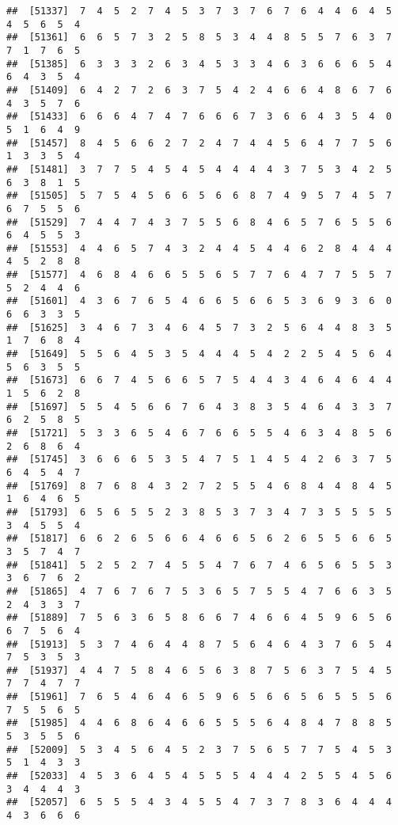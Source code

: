 \documentclass[
]{book}
\begin{document}
\begin{verbatim}
##  [51337]  7  4  5  2  7  4  5  3  7  3  7  6  7  6  4  4  6  4  5  4  5  6  5  4
##  [51361]  6  6  5  7  3  2  5  8  5  3  4  4  8  5  5  7  6  3  7  7  1  7  6  5
##  [51385]  6  3  3  3  2  6  3  4  5  3  3  4  6  3  6  6  6  5  4  6  4  3  5  4
##  [51409]  6  4  2  7  2  6  3  7  5  4  2  4  6  6  4  8  6  7  6  4  3  5  7  6
##  [51433]  6  6  6  4  7  4  7  6  6  6  7  3  6  6  4  3  5  4  0  5  1  6  4  9
##  [51457]  8  4  5  6  6  2  7  2  4  7  4  4  5  6  4  7  7  5  6  1  3  3  5  4
##  [51481]  3  7  7  5  4  5  4  5  4  4  4  4  3  7  5  3  4  2  5  6  3  8  1  5
##  [51505]  5  7  5  4  5  6  6  5  6  6  8  7  4  9  5  7  4  5  7  6  7  5  5  6
##  [51529]  7  4  4  7  4  3  7  5  5  6  8  4  6  5  7  6  5  5  6  6  4  5  5  3
##  [51553]  4  4  6  5  7  4  3  2  4  4  5  4  4  6  2  8  4  4  4  4  5  2  8  8
##  [51577]  4  6  8  4  6  6  5  5  6  5  7  7  6  4  7  7  5  5  7  5  2  4  4  6
##  [51601]  4  3  6  7  6  5  4  6  6  5  6  6  5  3  6  9  3  6  0  6  6  3  3  5
##  [51625]  3  4  6  7  3  4  6  4  5  7  3  2  5  6  4  4  8  3  5  1  7  6  8  4
##  [51649]  5  5  6  4  5  3  5  4  4  4  5  4  2  2  5  4  5  6  4  5  6  3  5  5
##  [51673]  6  6  7  4  5  6  6  5  7  5  4  4  3  4  6  4  6  4  4  1  5  6  2  8
##  [51697]  5  5  4  5  6  6  7  6  4  3  8  3  5  4  6  4  3  3  7  6  2  5  8  5
##  [51721]  5  3  3  6  5  4  6  7  6  6  5  5  4  6  3  4  8  5  6  2  6  8  6  4
##  [51745]  3  6  6  6  5  3  5  4  7  5  1  4  5  4  2  6  3  7  5  6  4  5  4  7
##  [51769]  8  7  6  8  4  3  2  7  2  5  5  4  6  8  4  4  8  4  5  1  6  4  6  5
##  [51793]  6  5  6  5  5  2  3  8  5  3  7  3  4  7  3  5  5  5  5  3  4  5  5  4
##  [51817]  6  6  2  6  5  6  6  4  6  6  5  6  2  6  5  5  6  6  5  3  5  7  4  7
##  [51841]  5  2  5  2  7  4  5  5  4  7  6  7  4  6  5  6  5  5  3  3  6  7  6  2
##  [51865]  4  7  6  7  6  7  5  3  6  5  7  5  5  4  7  6  6  3  5  2  4  3  3  7
##  [51889]  7  5  6  3  6  5  8  6  6  7  4  6  6  4  5  9  6  5  6  6  7  5  6  4
##  [51913]  5  3  7  4  6  4  4  8  7  5  6  4  6  4  3  7  6  5  4  7  5  3  5  3
##  [51937]  4  4  7  5  8  4  6  5  6  3  8  7  5  6  3  7  5  4  5  7  7  4  7  7
##  [51961]  7  6  5  4  6  4  6  5  9  6  5  6  6  5  6  5  5  5  6  7  5  5  6  5
##  [51985]  4  4  6  8  6  4  6  6  5  5  5  6  4  8  4  7  8  8  5  5  3  5  5  6
##  [52009]  5  3  4  5  6  4  5  2  3  7  5  6  5  7  7  5  4  5  3  5  1  4  3  3
##  [52033]  4  5  3  6  4  5  4  5  5  5  4  4  4  2  5  5  4  5  6  3  4  4  4  3
##  [52057]  6  5  5  5  4  3  4  5  5  4  7  3  7  8  3  6  4  4  4  4  3  6  6  6

\end{verbatim}
\end{document}
